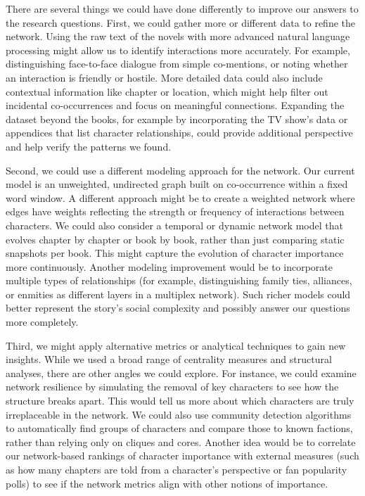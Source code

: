 \documentclass[12pt, a4paper]{article}
\begin{document}
There are several things we could have done differently to improve our answers to the research questions. 
First, we could gather more or different data to refine the network. 
Using the raw text of the novels with more advanced natural language processing might allow us to identify 
interactions more accurately. 
For example, distinguishing face-to-face dialogue from simple co-mentions, 
or noting whether an interaction is friendly or hostile. 
More detailed data could also include contextual information like chapter or location, 
which might help filter out incidental co-occurrences and focus on meaningful connections. 
Expanding the dataset beyond the books, for example by incorporating the TV show’s data or appendices that list character relationships,
could provide additional perspective and help verify the patterns we found. 

Second, we could use a different modeling approach for the network. Our current model is an unweighted, 
undirected graph built on co-occurrence within a fixed word window. 
A different approach might be to create a weighted network where edges have weights reflecting the strength or 
frequency of interactions between characters.
We could also consider a temporal or dynamic network model that evolves chapter by chapter or book by book, 
rather than just comparing static snapshots per book. This might capture the evolution of character importance more continuously.
Another modeling improvement would be to incorporate multiple types of relationships 
(for example, distinguishing family ties, alliances, or enmities as different layers in a multiplex network). 
Such richer models could better represent the story’s social complexity and possibly answer our questions more completely. 

Third, we might apply alternative metrics or analytical techniques to gain new insights. 
While we used a broad range of centrality measures and structural analyses, 
there are other angles we could explore. 
For instance, we could examine network resilience by simulating the removal of key characters to see how the structure breaks apart.
This would tell us more about which characters are truly irreplaceable in the network. 
We could also use community detection algorithms to automatically find groups of characters and compare those to known factions, 
rather than relying only on cliques and cores. 
Another idea would be to correlate our network-based rankings of character importance with external measures 
(such as how many chapters are told from a character’s perspective or fan popularity polls) 
to see if the network metrics align with other notions of importance. 
\end{document}
